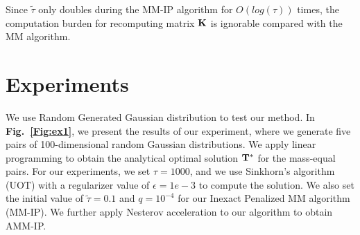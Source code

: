Since $\tilde{\tau}$ only doubles during the MM-IP algorithm for $O(log(\tau))$ times, the computation burden for recomputing matrix $\mathbf{K}$ is ignorable compared with the MM algorithm.

\section{Experiments}
We use Random Generated Gaussian distribution to test our method. In {\bf Fig.~\ref{Fig:ex1}}, we present the results of our experiment, where we generate five pairs of 100-dimensional random Gaussian distributions. We apply linear programming to obtain the analytical optimal solution $\mathbf{T}^{*}$ for the mass-equal pairs. For our experiments, we set $\tau = 1000$, and we use Sinkhorn's algorithm (UOT) with a regularizer value of $\epsilon = 1e-3$ to compute the solution. We also set the initial value of $\tilde{\tau} = 0.1$ and $q = 10^{-4}$ for our Inexact Penalized MM algorithm (MM-IP). We further apply Nesterov acceleration to our algorithm to obtain AMM-IP.

